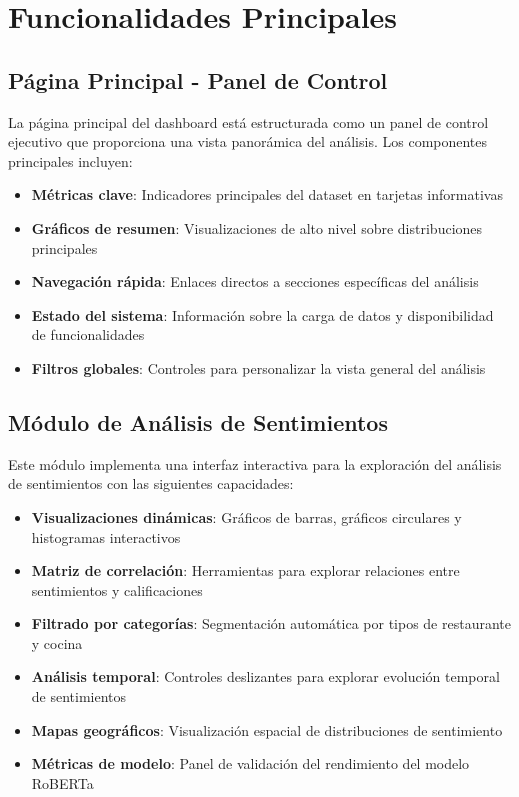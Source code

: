 \documentclass[12pt,a4paper,twoside,openany]{book}
\begin{document}
\section{Funcionalidades Principales}

\subsection{Página Principal - Panel de Control}

La página principal del dashboard está estructurada como un panel de control ejecutivo que proporciona una vista panorámica del análisis. Los componentes principales incluyen:

\begin{itemize}
    \item \textbf{Métricas clave}: Indicadores principales del dataset en tarjetas informativas
    \item \textbf{Gráficos de resumen}: Visualizaciones de alto nivel sobre distribuciones principales
    \item \textbf{Navegación rápida}: Enlaces directos a secciones específicas del análisis
    \item \textbf{Estado del sistema}: Información sobre la carga de datos y disponibilidad de funcionalidades
    \item \textbf{Filtros globales}: Controles para personalizar la vista general del análisis
\end{itemize}

\subsection{Módulo de Análisis de Sentimientos}

Este módulo implementa una interfaz interactiva para la exploración del análisis de sentimientos con las siguientes capacidades:

\begin{itemize}
    \item \textbf{Visualizaciones dinámicas}: Gráficos de barras, gráficos circulares y histogramas interactivos
    \item \textbf{Matriz de correlación}: Herramientas para explorar relaciones entre sentimientos y calificaciones
    \item \textbf{Filtrado por categorías}: Segmentación automática por tipos de restaurante y cocina
    \item \textbf{Análisis temporal}: Controles deslizantes para explorar evolución temporal de sentimientos
    \item \textbf{Mapas geográficos}: Visualización espacial de distribuciones de sentimiento
    \item \textbf{Métricas de modelo}: Panel de validación del rendimiento del modelo RoBERTa
\end{itemize}
\end{document}

